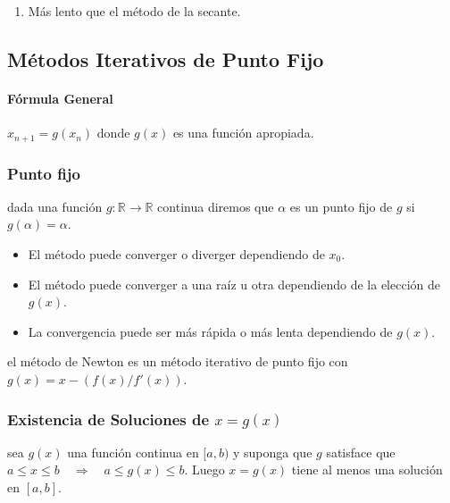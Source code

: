 \begin{enumerate}
\def\labelenumi{\arabic{enumi}.}
\tightlist
\item
  Más lento que el método de la secante.
\end{enumerate}

\hypertarget{muxe9todos-iterativos-de-punto-fijo}{%
\subsection{Métodos Iterativos de Punto
Fijo}\label{muxe9todos-iterativos-de-punto-fijo}}

\hypertarget{fuxf3rmula-general}{%
\paragraph{Fórmula General}\label{fuxf3rmula-general}}

\(x_{n+1} = g(x_n)\) donde \(g(x)\) es una función apropiada.

\hypertarget{punto-fijo}{%
\subsubsection{Punto fijo}\label{punto-fijo}}

\Definicion dada una función
\(g : \ensuremath{\mathbb{R}}\rightarrow \ensuremath{\mathbb{R}}\)
continua diremos que \(\alpha\) es un punto fijo de \(g\) si
\(g(\alpha) = \alpha\).

\begin{itemize}
\tightlist
\item
  El método puede converger o diverger dependiendo de \(x_0\).
\item
  El método puede converger a una raíz u otra dependiendo de la elección
  de \(g(x)\).
\item
  La convergencia puede ser más rápida o más lenta dependiendo de
  \(g(x)\).
\end{itemize}

\Ejemplo el método de Newton es un método iterativo de punto fijo con
\(g(x) = x -(f(x) / f'(x))\).

\hypertarget{existencia-de-soluciones-de-x-gx}{%
\subsubsection{\texorpdfstring{Existencia de Soluciones de
\(x = g(x)\)}{Existencia de Soluciones de x = g(x)}}\label{existencia-de-soluciones-de-x-gx}}

\Lema sea \(g(x)\) una función continua en \([a,b)\) y suponga que \(g\)
satisface que
\(a \leq x \leq b \ensuremath{\quad\Longrightarrow\quad}a \leq g(x) \leq b\).
Luego \(x = g(x)\) tiene al menos una solución en \([a,b]\).

